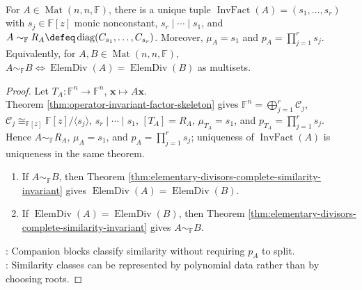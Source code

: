 \begin{theorem} \label{thm:rational-canonical-form-skeleton} \\
For $A\in\operatorname{Mat}(n,n,\mathbb{F})$, there is a unique tuple $\operatorname{InvFact}(A)=(s_1,\ldots,s_r)$ with $s_j\in\mathbb{F}[z]$ monic nonconstant, $s_r\mid\cdots\mid s_1$, and $A\sim_{\mathbb{F}}R_A\defeq\operatorname{diag}(C_{s_1},\ldots,C_{s_r})$. Moreover, $\mu_A=s_1$ and $p_A=\prod_{j=1}^r s_j$.\\
Equivalently, for $A,B\in\operatorname{Mat}(n,n,\mathbb{F})$, $A\sim_{\mathbb{F}}B\Longleftrightarrow\operatorname{ElemDiv}(A)=\operatorname{ElemDiv}(B)$ as multisets.
\begin{proof} Let $T_A:\mathbb{F}^n\to\mathbb{F}^n$, $\mathbf{x}\mapsto A\mathbf{x}$.\\
Theorem \ref{thm:operator-invariant-factor-skeleton} gives $\mathbb{F}^n=\bigoplus_{j=1}^r\mathcal{C}_j$, $\mathcal{C}_j\cong_{\mathbb{F}[z]}\mathbb{F}[z]/\langle s_j\rangle$, $s_r\mid\cdots\mid s_1$, $[T_A]=R_A$, $\mu_{T_A}=s_1$, and $p_{T_A}=\prod_{j=1}^r s_j$.\\
Hence $A\sim_{\mathbb{F}}R_A$, $\mu_A=s_1$, and $p_A=\prod_{j=1}^r s_j$; uniqueness of $\operatorname{InvFact}(A)$ is uniqueness in the same theorem.
\begin{enumerate}[label=\roman*.]
\setlength{\itemsep}{0pt}
\item[$(\Rightarrow)$]
If $A\sim_{\mathbb{F}}B$, then Theorem \ref{thm:elementary-divisors-complete-similarity-invariant} gives $\operatorname{ElemDiv}(A)=\operatorname{ElemDiv}(B)$.
\item[$(\Leftarrow)$]
If $\operatorname{ElemDiv}(A)=\operatorname{ElemDiv}(B)$, then Theorem \ref{thm:elementary-divisors-complete-similarity-invariant} gives $A\sim_{\mathbb{F}}B$.
\end{enumerate}
: Companion blocks classify similarity without requiring $p_A$ to split.\\
: Similarity classes can be represented by polynomial data rather than by choosing roots.
\end{proof}
\end{theorem}

